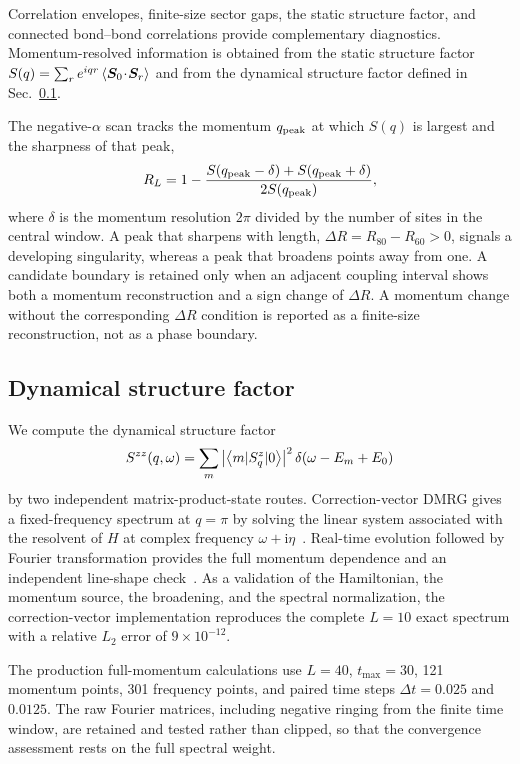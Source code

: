 Correlation envelopes, finite-size sector gaps, the static structure factor, and
connected bond--bond correlations provide complementary diagnostics.
Momentum-resolved information is obtained from the static structure factor
$S(q)=\sum_{r}e^{iqr}\left\langle \bm S_0\!\cdot\!\bm S_r\right\rangle$ and from the dynamical
structure factor defined in Sec.~\ref{sec:dsf}.

The negative-$\alpha$ scan tracks the momentum $q_{\mathrm{peak}}$ at which $S(q)$ is
largest and the sharpness of that peak,
\begin{equation}
R_L=1-\frac{S(q_{\mathrm{peak}}-\delta)+S(q_{\mathrm{peak}}+\delta)}{2S(q_{\mathrm{peak}})},
\label{eq:ratio}
\end{equation}
where $\delta$ is the momentum resolution $2\pi$ divided by the number of sites
in the central window.
A peak that sharpens with length, $\Delta R=R_{80}-R_{60}>0$, signals a developing
singularity, whereas a peak that broadens points away from one.
A candidate boundary is retained only when an adjacent coupling interval shows
both a momentum reconstruction and a sign change of $\Delta R$.
A momentum change without the corresponding $\Delta R$ condition is reported as
a finite-size reconstruction, not as a phase boundary.

\subsection{Dynamical structure factor}
\label{sec:dsf}

We compute the dynamical structure factor
\begin{equation}
S^{zz}(q,\omega)=\sum_{m}\left|\left\langle m|S^z_q|0\right\rangle\right|^2
\delta\!\left(\omega-E_m+E_0\right)
\label{eq:dsf}
\end{equation}
by two independent matrix-product-state routes.
Correction-vector DMRG gives a fixed-frequency spectrum at $q=\pi$ by solving the
linear system associated with the resolvent of $H$ at complex frequency
$\omega+\mathrm{i}\eta$~\cite{kuehner1999,jeckelmann2002,nocera2016,nocera2018rixs}.
Real-time evolution followed by Fourier transformation provides the full momentum
dependence and an independent line-shape check~\cite{vidal2004,paeckel2019}.
As a validation of the Hamiltonian, the momentum source, the broadening, and the
spectral normalization, the correction-vector implementation reproduces the
complete $L=10$ exact spectrum with a relative $L_2$ error of $9\times10^{-12}$.

The production full-momentum calculations use $L=40$, $t_{\max}=30$, 121 momentum
points, 301 frequency points, and paired time steps $\Delta t=0.025$ and
$0.0125$.
The raw Fourier matrices, including negative ringing from the finite time window,
are retained and tested rather than clipped, so that the convergence assessment
rests on the full spectral weight.

